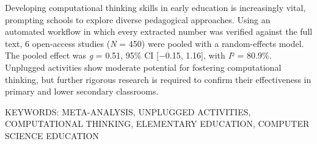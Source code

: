 \documentclass[
  lualatex, ja=standard, paper={182mm,257mm}, twocolumn, fontsize=8.5pt, baselineskip=13.5pt,
  line_length=24zw, column_gap=6.1mm, number_of_lines=45, head_space=24.5mm, gutter=16.25mm
]{jlreq}
\newcommand{\chapspaced}[1]{\par\vspace{13.5pt}\needspace{4\baselineskip}{\centering\gtfamily\bfseries #1\par}\nopagebreak}
\begin{document}
\chapspaced{Summary}
{\setlength{\parindent}{1\zw}\noindent Developing computational thinking skills in early education is increasingly vital, prompting schools to explore diverse pedagogical approaches. Using an automated workflow in which every extracted number was verified against the full text, 6 open-access studies (\textit{N} = 450) were pooled with a random-effects model. The pooled effect was \textit{g} = 0.51, 95\% CI [\ensuremath{-}0.15, 1.16], with \textit{I}² = 80.9\%. Unplugged activities show moderate potential for fostering computational thinking, but further rigorous research is required to confirm their effectiveness in primary and lower secondary classrooms.\par
KEYWORDS: META-ANALYSIS, UNPLUGGED ACTIVITIES, COMPUTATIONAL THINKING, ELEMENTARY EDUCATION, COMPUTER SCIENCE EDUCATION\par}
\end{document}
